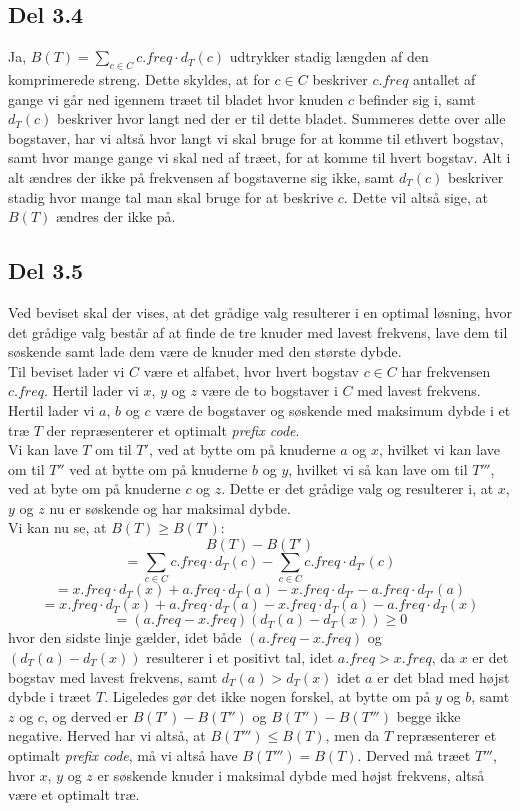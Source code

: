 \documentclass{report}
\begin{document}
\newpage

\subsection*{Del 3.4}
Ja, $B(T) = \sum_{c \in C} c.freq \cdot d_T(c)$ udtrykker stadig længden af den komprimerede streng. Dette skyldes, at for $c \in C$ beskriver $c.freq$ antallet af gange vi går ned igennem træet til bladet hvor knuden $c$ befinder sig i, samt $d_T(c)$ beskriver hvor langt ned der er til dette bladet. Summeres dette over alle bogstaver, har vi altså hvor langt vi skal bruge for at komme til ethvert bogstav, samt hvor mange gange vi skal ned af træet, for at komme til hvert bogstav. Alt i alt ændres der ikke på frekvensen af bogstaverne sig ikke, samt $d_T(c)$ beskriver stadig hvor mange tal man skal bruge for at beskrive $c$. Dette vil altså sige, at $B(T)$ ændres der ikke på.

\newpage

\subsection*{Del 3.5}
Ved beviset skal der vises, at det grådige valg resulterer i en optimal løsning, hvor det grådige valg består af at finde de tre knuder med lavest frekvens, lave dem til søskende samt lade dem være de knuder med den største dybde. \\
Til beviset lader vi $C$ være et alfabet, hvor hvert bogstav $c \in C$ har frekvensen $c.freq$. Hertil lader vi $x$, $y$ og $z$ være de to bogstaver i $C$ med lavest frekvens. Hertil lader vi $a$, $b$ og $c$ være de bogstaver og søskende med maksimum dybde i et træ $T$ der repræsenterer et optimalt \textit{prefix code}. \\
Vi kan lave $T$ om til $T'$, ved at bytte om på knuderne $a$ og $x$, hvilket vi kan lave om til $T''$ ved at bytte om på knuderne $b$ og $y$, hvilket vi så kan lave om til $T'''$, ved at byte om på knuderne $c$ og $z$. Dette er det grådige valg og resulterer i, at $x$, $y$ og $z$ nu er søskende og har maksimal dybde. \\
Vi kan nu se, at $B(T) \geq B(T')$:
$$B(T) - B(T')$$
$$= \sum_{c \in C} c.freq \cdot d_T(c) - \sum_{c \in C} c.freq \cdot d_{T'} (c)$$
$$= x.freq \cdot d_T(x) + a.freq \cdot d_T(a) - x.freq \cdot d_{T'} - a.freq \cdot d_{T'}(a)$$
$$= x.freq \cdot d_T(x) + a.freq \cdot d_T(a) - x.freq \cdot d_T(a) - a.freq \cdot d_T(x)$$
$$= (a.freq - x.freq)(d_T(a) - d_T(x)) \geq 0$$
hvor den sidste linje gælder, idet både $(a.freq - x.freq)$ og $(d_T(a) - d_T(x))$ resulterer i et positivt tal, idet $a.freq > x.freq$, da $x$ er det bogstav med lavest frekvens, samt $d_T(a) > d_T(x)$ idet $a$ er det blad med højst dybde i træet $T$. Ligeledes gør det ikke nogen forskel, at bytte om på $y$ og $b$, samt $z$ og $c$, og derved er $B(T') - B(T'')$ og $B(T'') - B(T''')$ begge ikke negative. Herved har vi altså, at $B(T''') \leq B(T)$, men da $T$ repræsenterer et optimalt \textit{prefix code}, må vi altså have $B(T''') = B(T)$. Derved må træet $T'''$, hvor $x$, $y$ og $z$ er søskende knuder i maksimal dybde med højst frekvens, altså være et optimalt træ.
\end{document}

